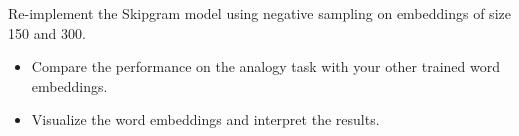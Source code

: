\item Re-implement the Skipgram model using negative sampling on embeddings of size 150 and 300.
\begin{itemize}
\item Compare the performance on the analogy task with your other trained word embeddings.
\item Visualize the word embeddings and interpret the results.
\end{itemize}